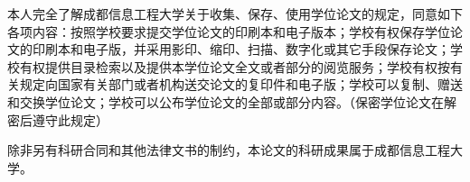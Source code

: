 
\vspace{0.4em}

\begin{thesisdeclbody}
本人完全了解成都信息工程大学关于收集、保存、使用学位论文的规定，同意如下各项内容：按照学校要求提交学位论文的印刷本和电子版本；学校有权保存学位论文的印刷本和电子版，并采用影印、缩印、扫描、数字化或其它手段保存论文；学校有权提供目录检索以及提供本学位论文全文或者部分的阅览服务；学校有权按有关规定向国家有关部门或者机构送交论文的复印件和电子版；学校可以复制、赠送和交换学位论文；学校可以公布学位论文的全部或部分内容。（保密学位论文在解密后遵守此规定）

除非另有科研合同和其他法律文书的制约，本论文的科研成果属于成都信息工程大学。
\end{thesisdeclbody}

\vspace{0.2em}

